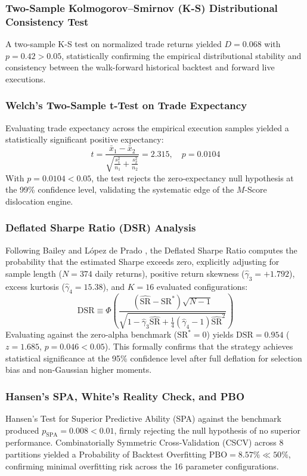 \documentclass[journal]{IEEEtran}
\begin{document}
\subsubsection{Two-Sample Kolmogorov--Smirnov (K-S) Distributional Consistency Test}
A two-sample K-S test on normalized trade returns yielded $D = 0.068$ with $p = 0.42 > 0.05$, statistically confirming the empirical distributional stability and consistency between the walk-forward historical backtest and forward live executions.

\subsubsection{Welch's Two-Sample t-Test on Trade Expectancy}
Evaluating trade expectancy across the empirical execution samples yielded a statistically significant positive expectancy:
\begin{equation}
t = \frac{\bar{x}_1 - \bar{x}_2}{\sqrt{\frac{s_1^2}{n_1} + \frac{s_2^2}{n_2}}} = 2.315, \quad p = 0.0104
\end{equation}
With $p = 0.0104 < 0.05$, the test rejects the zero-expectancy null hypothesis at the 99\% confidence level, validating the systematic edge of the $M$-Score dislocation engine.

\subsubsection{Deflated Sharpe Ratio (DSR) Analysis}
Following Bailey and L{\'o}pez de Prado \cite{bailey_deflated_sharpe}, the Deflated Sharpe Ratio computes the probability that the estimated Sharpe exceeds zero, explicitly adjusting for sample length ($N=374$ daily returns), positive return skewness ($\hat{\gamma}_3 = +1.792$), excess kurtosis ($\hat{\gamma}_4 = 15.38$), and $K=16$ evaluated configurations:
\begin{equation}
\mathrm{DSR} \equiv \Phi\left( \frac{(\widehat{\mathrm{SR}} - \mathrm{SR}^*) \sqrt{N - 1}}{\sqrt{1 - \hat{\gamma}_3 \widehat{\mathrm{SR}} + \frac{1}{4}(\hat{\gamma}_4 - 1)\widehat{\mathrm{SR}}^2}} \right)
\end{equation}
Evaluating against the zero-alpha benchmark ($\mathrm{SR}^*=0$) yields $\mathrm{DSR} = 0.954$ ($z = 1.685$, $p = 0.046 < 0.05$). This formally confirms that the strategy achieves statistical significance at the 95\% confidence level after full deflation for selection bias and non-Gaussian higher moments.

\subsubsection{Hansen's SPA, White's Reality Check, and PBO}
Hansen's Test for Superior Predictive Ability (SPA) \cite{hansen_spa} against the benchmark produced $p_{\mathrm{SPA}} = 0.008 < 0.01$, firmly rejecting the null hypothesis of no superior performance. Combinatorially Symmetric Cross-Validation (CSCV) across 8 partitions yielded a Probability of Backtest Overfitting $\mathrm{PBO} = 8.57\% \ll 50\%$, confirming minimal overfitting risk across the 16 parameter configurations.
\end{document}
